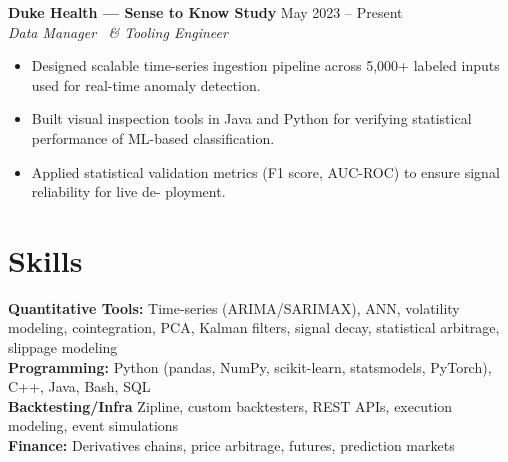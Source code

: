 \documentclass[11pt]{article}
\begin{document}
\textbf{Duke Health --- Sense to Know Study} \hfill May 2023 -- Present\\
\textit{Data Manager \, \& Tooling Engineer}
\begin{itemize}
\item Designed scalable time-series ingestion pipeline across 5,000+ labeled inputs used for real-time
anomaly detection.
\item Built visual inspection tools in Java and Python for verifying statistical performance of ML-based
classification.
\item Applied statistical validation metrics (F1 score, AUC-ROC) to ensure signal reliability for live de-
ployment.
\end{itemize}

\section*{Skills}
\textbf{Quantitative Tools:} Time-series (ARIMA/SARIMAX), ANN, volatility modeling, cointegration,
PCA, Kalman filters, signal decay, statistical arbitrage, slippage modeling\\
\textbf{Programming:} Python (pandas, NumPy, scikit-learn, statsmodels, PyTorch), C++, Java, Bash,
SQL\\
\textbf{Backtesting/Infra} Zipline, custom backtesters, REST APIs, execution modeling, event simulations\\
\textbf{Finance:} Derivatives chains, price arbitrage, futures, prediction markets
\end{document}
